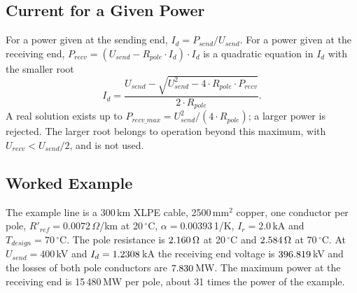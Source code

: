 \subsection{Current for a Given Power}

For a power given at the sending end, $I_d = P_{send} / U_{send}$. For a power given at the receiving end,
$P_{recv} = (U_{send} - R_{pole} \cdot I_d) \cdot I_d$ is a quadratic equation in $I_d$ with the smaller root
\begin{equation}
  I_d = \frac{U_{send} - \sqrt{U_{send}^2 - 4 \cdot R_{pole} \cdot P_{recv}}}{2 \cdot R_{pole}} .
\end{equation}
A real solution exists up to $P_{recv\_max} = U_{send}^2 / (4 \cdot R_{pole})$; a larger power is rejected. The
larger root belongs to operation beyond this maximum, with $U_{recv} < U_{send} / 2$, and is not used.

\subsection{Worked Example}
\label{sec:dc-line-example}

The example line is a 300\,km XLPE cable, 2500\,mm$^2$ copper, one conductor per pole, $R'_{ref} = 0.0072\,\Omega$/km
at 20\,$^{\circ}$C, $\alpha = 0.00393$\,1/K, $I_r = 2.0$\,kA and $T_{design} = 70\,^{\circ}$C. The pole resistance is
$2.160\,\Omega$ at 20\,$^{\circ}$C and $2.584\,\Omega$ at 70\,$^{\circ}$C. At $U_{send} = 400$\,kV and
$I_d = 1.2308$\,kA the receiving end voltage is $396.819$\,kV and the losses of both pole conductors are
$7.830$\,MW. The maximum power at the receiving end is 15\,480\,MW per pole, about 31 times the power of the example.
